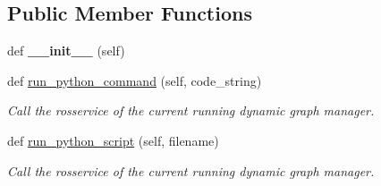 \subsection*{Public Member Functions}
\begin{DoxyCompactItemize}
\item 
\mbox{\label{classros_1_1ros__client_1_1RosPythonInterpreter_abdeeebfed829bcb91f8f5fe195b6bdc9}} 
def {\bfseries \+\_\+\+\_\+init\+\_\+\+\_\+} (self)
\item 
\mbox{\label{classros_1_1ros__client_1_1RosPythonInterpreter_ad1de2f9fb464e1f3f81dbac5396208f7}} 
def \hyperlink{classros_1_1ros__client_1_1RosPythonInterpreter_ad1de2f9fb464e1f3f81dbac5396208f7}{run\+\_\+python\+\_\+command} (self, code\+\_\+string)
\begin{DoxyCompactList}\small\item\em Call the rosservice of the current running dynamic graph manager. \end{DoxyCompactList}\item 
\mbox{\label{classros_1_1ros__client_1_1RosPythonInterpreter_a63e042101395102abd40958406bea3a2}} 
def \hyperlink{classros_1_1ros__client_1_1RosPythonInterpreter_a63e042101395102abd40958406bea3a2}{run\+\_\+python\+\_\+script} (self, filename)
\begin{DoxyCompactList}\small\item\em Call the rosservice of the current running dynamic graph manager. \end{DoxyCompactList}\end{DoxyCompactItemize}
